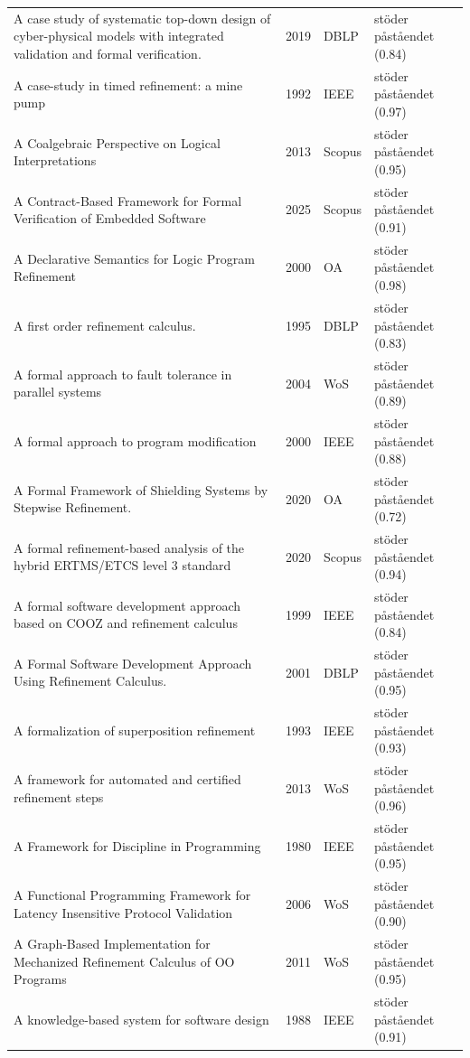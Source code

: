\begin{longtable}{@{}%
  >{\raggedright\arraybackslash}p{}c%
  >{\raggedright\arraybackslash}p{}%
  >{\raggedright\arraybackslash}p{}@{}}
A case study of systematic top-down design of cyber-physical models with integrated validation and formal verification. & 2019 & DBLP & stöder påståendet (0.84) \\
A case-study in timed refinement: a mine pump & 1992 & IEEE & stöder påståendet (0.97) \\
A Coalgebraic Perspective on Logical Interpretations & 2013 & Scopus & stöder påståendet (0.95) \\
A Contract-Based Framework for Formal Verification of Embedded Software & 2025 & Scopus & stöder påståendet (0.91) \\
A Declarative Semantics for Logic Program Refinement & 2000 & OA & stöder påståendet (0.98) \\
A first order refinement calculus. & 1995 & DBLP & stöder påståendet (0.83) \\
A formal approach to fault tolerance in parallel systems & 2004 & WoS & stöder påståendet (0.89) \\
A formal approach to program modification & 2000 & IEEE & stöder påståendet (0.88) \\
A Formal Framework of Shielding Systems by Stepwise Refinement. & 2020 & OA & stöder påståendet (0.72) \\
A formal refinement-based analysis of the hybrid ERTMS/ETCS level 3 standard & 2020 & Scopus & stöder påståendet (0.94) \\
A formal software development approach based on COOZ and refinement calculus & 1999 & IEEE & stöder påståendet (0.84) \\
A Formal Software Development Approach Using Refinement Calculus. & 2001 & DBLP & stöder påståendet (0.95) \\
A formalization of superposition refinement & 1993 & IEEE & stöder påståendet (0.93) \\
A framework for automated and certified refinement steps & 2013 & WoS & stöder påståendet (0.96) \\
A Framework for Discipline in Programming & 1980 & IEEE & stöder påståendet (0.95) \\
A Functional Programming Framework for Latency Insensitive Protocol Validation & 2006 & WoS & stöder påståendet (0.90) \\
A Graph-Based Implementation for Mechanized Refinement Calculus of OO Programs & 2011 & WoS & stöder påståendet (0.95) \\
A knowledge-based system for software design & 1988 & IEEE & stöder påståendet (0.91) \\

\end{longtable}
